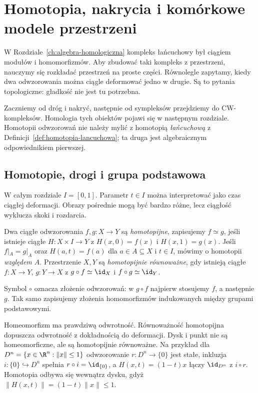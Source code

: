 \chapter{Homotopia, nakrycia i komórkowe modele przestrzeni}
\label{ch:topologia-algebraiczna-podstawy}

\providecommand{\atlasref}[2]{#2}

W Rozdziale~\ref{ch:algebra-homologiczna} kompleks łańcuchowy
był ciągiem modułów i homomorfizmów. Aby zbudować taki
kompleks z przestrzeni, nauczymy się rozkładać przestrzeń
na proste części. Równolegle zapytamy, kiedy dwa odwzorowania
można ciągle deformować jedno w drugie. Są to pytania
topologiczne: gładkość nie jest tu potrzebna.

Zaczniemy od dróg i nakryć, następnie od sympleksów
przejdziemy do CW-kompleksów. Homologia tych obiektów
pojawi się w następnym rozdziale. Homotopii odwzorowań
nie należy mylić z homotopią \emph{łańcuchową}
z Definicji~\ref{def:homotopia-lancuchowa};
ta druga jest algebraicznym odpowiednikiem pierwszej.

\section{Homotopie, drogi i grupa podstawowa}
\label{sec:homotopie-pi1}

W całym rozdziale $I=[0,1]$. Parametr $t\in I$
można interpretować jako czas ciągłej deformacji.
Obrazy pośrednie mogą być bardzo różne, lecz
ciągłość wyklucza skoki i rozdarcia.

\begin{definicja}
\label{def:homotopia-topologiczna}
Dwa ciągłe odwzorowania $f,g:X\to Y$ są
\emph{homotopijne}, zapisujemy $f\simeq g$,
jeśli istnieje ciągłe $H:X\times I\to Y$ z
$H(x,0)=f(x)$ i $H(x,1)=g(x)$.
Jeśli $f|_A=g|_A$ oraz $H(a,t)=f(a)$
dla $a\in A\subseteq X$ i $t\in I$,
mówimy o homotopii \emph{względem $A$}.
Przestrzenie $X,Y$ są \emph{homotopijnie
równoważne}, gdy istnieją ciągłe $f:X\to Y$,
$g:Y\to X$ z $g\circ f\simeq\id_X$ i
$f\circ g\simeq\id_Y$.
\end{definicja}

Symbol $\circ$ oznacza złożenie odwzorowań:
w $g\circ f$ najpierw stosujemy $f$, a następnie $g$.
Tak samo zapisujemy złożenia homomorfizmów indukowanych
między grupami podstawowymi.

Homeomorfizm ma prawdziwą odwrotność.
Równoważność homotopijna dopuszcza odwrotność
z dokładnością do deformacji. Dysk i punkt
nie są homeomorficzne, ale są homotopijnie
równoważne.
Na przykład dla $D^n=\{x\in\R^n:\|x\|\leq1\}$ odwzorowanie
$r:D^n\to\{0\}$ jest stałe, inkluzja
$i:\{0\}\hookrightarrow D^n$ spełnia $r\circ i=\id_{\{0\}}$,
a $H(x,t)=(1-t)x$ łączy $\id_{D^n}$ z $i\circ r$.
Homotopia odbywa się wewnątrz dysku, gdyż
$\|H(x,t)\|=(1-t)\|x\|\leq1$.

